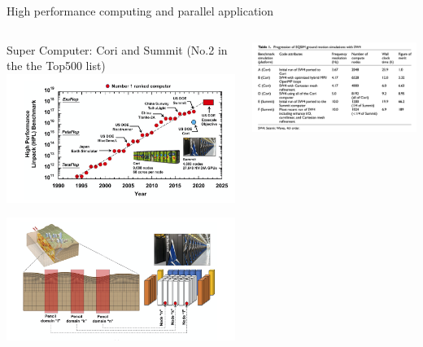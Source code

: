 \documentclass[hangout,aspectratio=1610,10pt]{beamer}
\begin{document}
\begin{frame}{High performance computing and parallel application}
\begin{columns}
	\begin{column}{.5\columnwidth}
	Super Computer:	Cori and Summit (No.2 in the the Top500 list)
		\includegraphics[width=1.\linewidth]{plots/fig3}
		
		\includegraphics[width=1.\linewidth]{plots/fig12}
	\end{column}
	\begin{column}{.5\columnwidth}
		\includegraphics[width=1.\linewidth]{plots/tab1}
		

\end{column}
\end{columns}
\end{frame}
\end{document}
